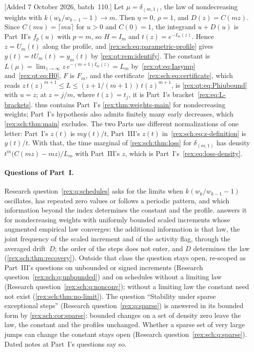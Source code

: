\begin{remark}\label{rex:sch:rem:parts}
[Added 7 October 2026, batch~110.] Let $\mu=\delta_{(m,1)}$, the law of
nondecreasing weights with $k(w_k/w_{k-1}-1)\to m$. Then $\eta=0$,
$\rho=1$, and $D(z)=C(mz)$. Since $C(mu)=\lceil mu\rceil$ for $u>0$ and
$C(0)=1$, the integrand $u+D(u)$ is Part~II's $f_p(u)$ with $p=m$, so
$H=I_m$ and $t(z)=e^{-I_m(z)}$. Hence $z=U_m(t)$ along the profile, and
\eqref{rex:sch:eq:parametric-profile} gives $y(t)=tU_m(t)=y_m(t)$ by
\cref{rex:qt:rem:identify}. The constant is
$L(\mu)=\lim_{z\to\infty}z\,e^{-(m+1)I_m(z)}=L_m$ by~\eqref{rex:qt:eq:Iasymp}
and~\eqref{rex:qt:eq:H0}, $F$ is $F_m$, and the
certificate~\eqref{rex:sch:eq:certificate}, which reads
$z\,t(z)^{m+1}\le L\le(z+1/(m+1))\,t(z)^{m+1}$, is
\eqref{rex:qt:eq:Phiubound} with $u=z$; at $z=j/m$, where $t(z)=t_j$, it is
Part~I's bracket~\eqref{rex:eq:L-brackets}.  thus
contains Part~I's \cref{rex:thm:weights-main} for nondecreasing weights;
Part~I's hypothesis also admits finitely many early decreases, which
\cref{rex:sch:thm:main} excludes. The two Parts use different
normalizations of one letter: Part~I's $z(t)$ is $my(t)/t$, Part~III's
$z(t)$ in~\eqref{rex:sch:eq:z-definition} is $y(t)/t$. With that,
the time marginal of \cref{rex:sch:thm:loss} for $\delta_{(m,1)}$ has
density $t^m\bigl(C(mz)-mz\bigr)/L_m$ with Part~III's $z$, which is
Part~I's~\eqref{rex:eq:loss-density}.
\end{remark}

\paragraph{Questions of Part~I.} Research question~\ref{rex:q:schedules}
asks for the limits when $k(w_k/w_{k-1}-1)$ oscillates, has repeated zero
values or follows a periodic pattern, and which information beyond the
index determines the constant and the profile. 
answers it for nondecreasing weights with uniformly bounded scaled
increments whose augmented empirical law converges: the additional
information is that law, the joint frequency of the scaled increment and of
the activity flag, through the averaged drift~$D$; the order of the steps
does not enter, and $D$ determines the law (\cref{rex:sch:thm:recovery}).
Outside that class the question stays open, re-scoped as Part~III's
questions on unbounded or signed increments
(Research question~\ref{rex:sch:q:unbounded}) and on schedules without a
limiting law (Research question~\ref{rex:sch:q:nonconv}); without a
limiting law the constant need not exist (\cref{rex:sch:thm:no-limit}).
The question ``Stability under sparse exceptional steps''
(Research question~\ref{rex:q:sparse}) is answered in its bounded form by
\cref{rex:sch:cor:sparse}: bounded changes on a set of density zero leave
the law, the constant and the profiles unchanged. Whether a sparse set of
very large jumps can change the constant stays open
(Research question~\ref{rex:sch:q:sparse}). Dated notes at Part~I's
questions say so.

